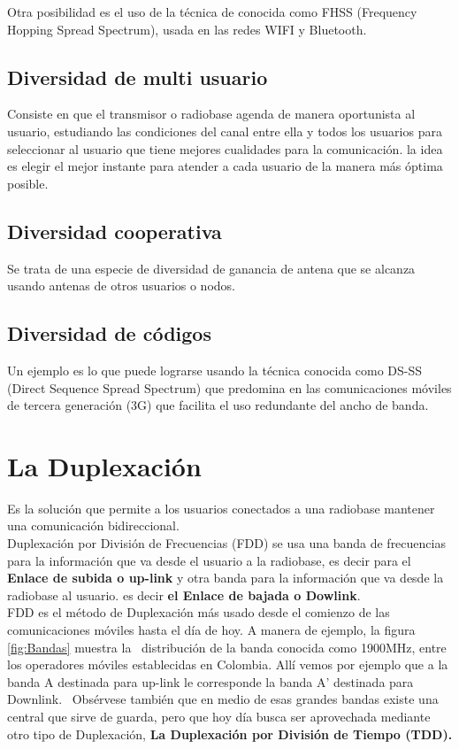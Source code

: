 Otra posibilidad es el uso de la técnica de conocida como FHSS (Frequency Hopping Spread Spectrum), usada en las redes WIFI y Bluetooth.\\

\subsection{Diversidad de multi usuario}

Consiste en que el transmisor o radiobase agenda de manera oportunista al usuario, estudiando las condiciones del canal entre ella y todos los usuarios para seleccionar al usuario que tiene mejores cualidades para la comunicación. la idea es elegir el mejor instante para atender a cada usuario de la manera más óptima posible. 

\subsection{Diversidad cooperativa}

Se trata de una especie de diversidad de ganancia de antena que se alcanza usando antenas de otros usuarios o nodos.

\subsection{Diversidad de códigos}

Un ejemplo es lo que puede lograrse usando la técnica conocida como DS-SS (Direct Sequence Spread Spectrum) que predomina en las comunicaciones móviles de tercera generación (3G) que facilita el uso redundante del ancho de banda.

\section{La Duplexación}

Es la solución que permite a los usuarios conectados a una radiobase mantener una comunicación bidireccional. \\

Duplexación por División de Frecuencias (FDD) se usa una banda de frecuencias para la información que va desde el usuario a la radiobase, es decir para el \textbf{ Enlace de subida o up-link} y otra banda para la información que va desde la radiobase al usuario. es decir \textbf{el Enlace de bajada o Dowlink}. \\

FDD es el método de Duplexación más usado desde el comienzo de las comunicaciones móviles hasta el día de hoy. A manera de ejemplo, la figura \ref{fig:Bandas} muestra la \
distribución de la banda conocida como 1900MHz, entre los operadores móviles establecidas en Colombia. Allí vemos por ejemplo que a la banda A destinada para up-link le corresponde la banda A’ destinada para Downlink. \
Obsérvese también que en medio de esas grandes bandas existe una central que sirve de guarda, pero que hoy día busca ser aprovechada mediante otro tipo de Duplexación, \textbf{La Duplexación por División de Tiempo (TDD).} \\

